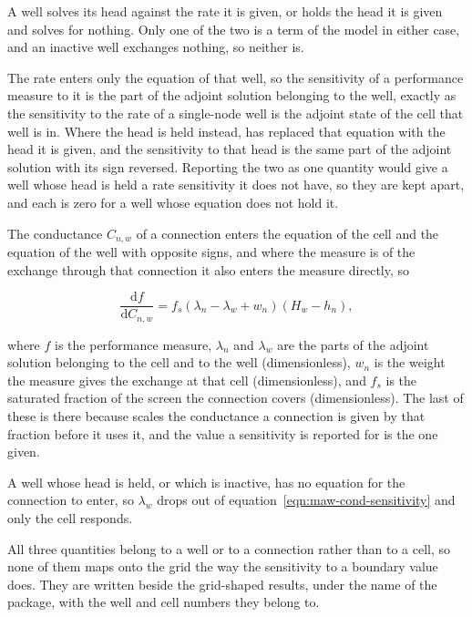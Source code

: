 A well solves its head against the rate it is given, or holds the head it is given and solves for nothing. Only one of the two is a term of the model in either case, and an inactive well exchanges nothing, so neither is.

The rate enters only the equation of that well, so the sensitivity of a performance measure to it is the part of the adjoint solution belonging to the well, exactly as the sensitivity to the rate of a single-node well is the adjoint state of the cell that well is in. Where the head is held instead, \mf{} has replaced that equation with the head it is given, and the sensitivity to that head is the same part of the adjoint solution with its sign reversed. Reporting the two as one quantity would give a well whose head is held a rate sensitivity it does not have, so they are kept apart, and each is zero for a well whose equation does not hold it.

The conductance $C_{n,w}$ of a connection enters the equation of the cell and the equation of the well with opposite signs, and where the measure is of the exchange through that connection it also enters the measure directly, so

\begin{equation}
	\label{eqn:maw-cond-sensitivity}
	\frac{\mathrm{d} f}{\mathrm{d} C_{n,w}} = f_{s} \left(
	\lambda_{n} - \lambda_{w} + w_{n} \right)
	\left( H_{w} - h_{n} \right),
\end{equation}

\noindent where $f$ is the performance measure, $\lambda_{n}$ and $\lambda_{w}$ are the parts of the adjoint solution belonging to the cell and to the well (dimensionless), $w_{n}$ is the weight the measure gives the exchange at that cell (dimensionless), and $f_{s}$ is the saturated fraction of the screen the connection covers (dimensionless). The last of these is there because \mf{} scales the conductance a connection is given by that fraction before it uses it, and the value a sensitivity is reported for is the one given.

A well whose head is held, or which is inactive, has no equation for the connection to enter, so $\lambda_{w}$ drops out of equation~\ref{eqn:maw-cond-sensitivity} and only the cell responds.

All three quantities belong to a well or to a connection rather than to a cell, so none of them maps onto the grid the way the sensitivity to a boundary value does. They are written beside the grid-shaped results, under the name of the package, with the well and cell numbers they belong to.

